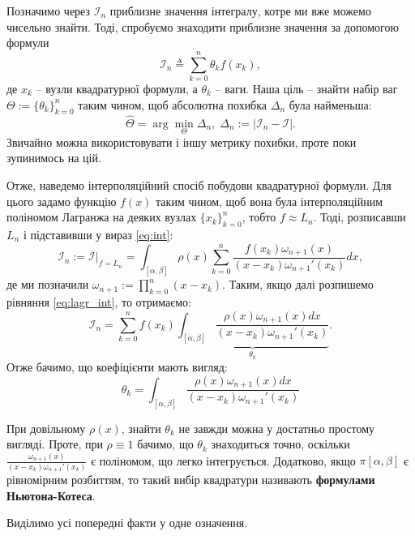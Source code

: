 \documentclass[14pt]{extarticle}
\begin{document}
Позначимо через $\mathcal{I}_n$ приблизне значення інтегралу, котре ми вже можемо чисельно знайти. Тоді, спробуємо знаходити приблизне значення за допомогою формули
\begin{equation}
\mathcal{I}_n \triangleq \sum_{k=0}^n \theta_kf(x_k),
\end{equation}
де $x_k$ -- вузли квадратурної формули, а $\theta_k$ -- ваги. Наша ціль -- знайти набір ваг $\Theta:=\{\theta_k\}_{k=0}^n$ таким чином, щоб абсолютна похибка $\Delta_n$ була найменьша:
\begin{equation}\label{eq:error}
\hat{\Theta} = \arg\min_{\Theta} \Delta_n, \; \Delta_n := |\mathcal{I}_n - \mathcal{I}|.
\end{equation}
Звичайно можна використовувати і іншу метрику похибки, проте поки зупинимось на цій. 

Отже, наведемо інтерполяційний спосіб побудови квадратурної формули. Для цього задамо функцію $f(x)$ таким чином, щоб вона була інтерполяційним поліномом Лагранжа на деяких вузлах $\{x_k\}_{k=0}^n$, тобто $f \approx L_n$. Тоді, розписавши $L_n$ і підставивши у вираз \ref{eq:int}:
\begin{equation}\label{eq:lagr_int}
\mathcal{I}_n := \mathcal{I}\Big|_{f=L_n}= \int_{[\alpha,\beta]} \rho(x) \sum_{k=0}^n \frac{f(x_k)\omega_{n+1}(x)}{(x-x_k)\omega_{n+1}'(x_k)}dx,
\end{equation}
де ми позначили $\omega_{n+1} := \prod_{k=0}^n (x-x_k)$. Таким, якщо далі розпишемо рівняння \ref{eq:lagr_int}, то отримаємо:
\begin{equation}
\mathcal{I}_n = \sum_{k=0}^n f(x_k) \underbrace{\int_{[\alpha,\beta]} \frac{\rho(x)\omega_{n+1}(x)dx}{(x-x_k)\omega_{n+1}'(x_k)}}_{\theta_k}.
\end{equation}
Отже бачимо, що коефіцієнти мають вигляд:
\begin{equation}
\theta_k = \int_{[\alpha,\beta]} \frac{\rho(x)\omega_{n+1}(x)dx}{(x-x_k)\omega_{n+1}'(x_k)}
\end{equation}

При довільному $\rho(x)$, знайти $\theta_k$ не завжди можна у достатньо простому вигляді. Проте, при $\rho \equiv 1$ бачимо, що $\theta_k$ знаходиться точно, оскільки $\frac{\omega_{n+1}(x)}{(x-x_k)\omega_{n+1}'(x_k)}$ є поліномом, що легко інтегрується. Додатково, якщо $\pi[\alpha,\beta]$ є рівномірним розбиттям, то такий вибір квадратури називають \textbf{формулами Ньютона-Котеса}. 

Виділимо усі попередні факти у одне означення.
\end{document}
